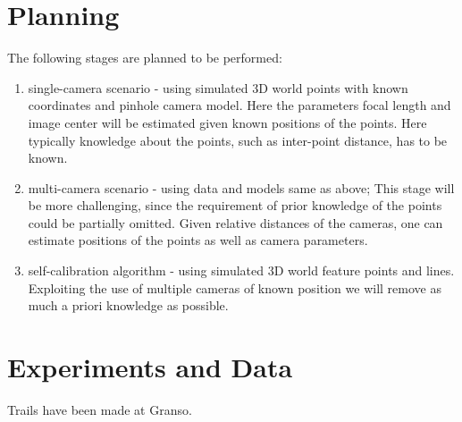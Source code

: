 \documentclass[12pt]{extarticle}
\begin{document}
\section{Planning}
The following stages are planned to be performed:
\begin{enumerate}
\item single-camera scenario - using simulated 3D world points with
  known coordinates and pinhole camera model. Here the parameters
  focal length and image center will be estimated given known
  positions of the points. Here typically knowledge about the points,
  such as inter-point distance, has to be known.
\item multi-camera scenario - using data and models same as above;
  This stage will be more challenging, since the requirement of prior
  knowledge of the points could be partially omitted. Given relative
  distances of the cameras, one can estimate positions of the points
  as well as camera parameters.
\item self-calibration algorithm -  using simulated 3D world feature
  points and lines. Exploiting the use of multiple cameras of known
  position we will remove as much a priori knowledge as possible.

\end{enumerate}

\section{Experiments and Data}

Trails have been made at Granso.



\end{document}
